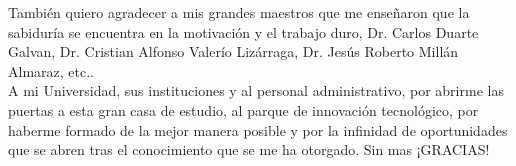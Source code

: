 
\begin{acknowledgements}

También quiero agradecer a mis grandes maestros que me enseñaron que la sabiduría se encuentra en la motivación y el trabajo duro, Dr. Carlos Duarte Galvan, Dr. Cristian Alfonso Valerío Lizárraga, Dr. Jesús Roberto Millán Almaraz, etc..\\
A mi Universidad, sus instituciones y al personal administrativo, por abrirme las puertas a esta gran casa de estudio, al parque de innovación tecnológico, por haberme formado de la mejor manera posible y por la infinidad de oportunidades que se abren tras el conocimiento que se me ha otorgado. Sin mas ¡GRACIAS!
\end{acknowledgements}




